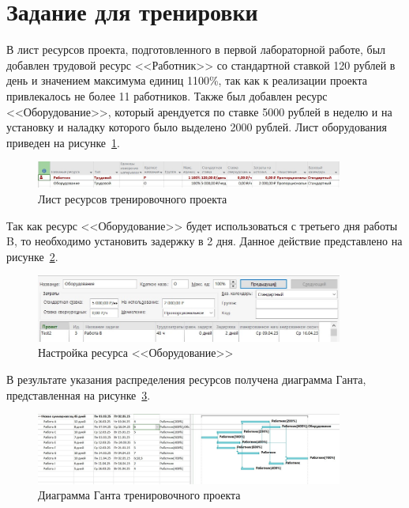 \setcounter{page}{2}
\section{Задание для тренировки}

В лист ресурсов проекта, подготовленного в первой лабораторной работе, был добавлен трудовой ресурс <<Работник>> со стандартной ставкой 120 рублей в день и значением максимума единиц 1100\%, так как к реализации проекта привлекалось не более 11 работников.
Также был добавлен ресурс <<Оборудование>>, который арендуется по ставке 5000 рублей в неделю и на установку и наладку которого было выделено 2000 рублей.
Лист оборудования приведен на рисунке~\ref{fig:test_list}.

\begin{figure}[H]
	\centering
	\includegraphics[width=0.9\textwidth]{img/test/equipment.jpg}
	\caption{Лист ресурсов тренировочного проекта}
	\label{fig:test_list}
\end{figure}

Так как ресурс <<Оборудование>> будет использоваться с третьего дня работы B, то необходимо установить задержку в 2 дня.
Данное действие представлено на рисунке~\ref{fig:test_delay}.

\begin{figure}[H]
	\centering
	\includegraphics[width=0.9\textwidth]{img/test/delay.jpg}
	\caption{Настройка ресурса <<Оборудование>>}
	\label{fig:test_delay}
\end{figure}

В результате указания распределения ресурсов получена диаграмма Ганта, представленная на рисунке~\ref{fig:test_gant}.
	
\begin{figure}[H]
	\centering
	\includegraphics[width=0.9\textwidth]{img/test/add_worker.jpg}
	\caption{Диаграмма Ганта тренировочного проекта}
	\label{fig:test_gant}
\end{figure}


